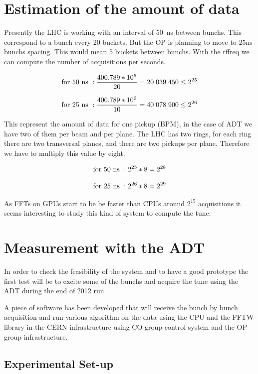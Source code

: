 %

\appendix

\chapter{Estimation of the amount of data}

Presently the \gls{LHC} is working with an interval of 50~ns between \glspl{bunch}. This correspond to a bunch every 20 \glspl{bucket}. But the \gls{OP} is planning to move to 25ns \glspl{bunch} spacing. This would mean 5 \glspl{bucket} between \glspl{bunch}. With the \gls{rffreq} we can compute the number of acquisitions per seconds.

$${\rm for~}50{\rm ~ns}~: \frac{400.789*10^{6}}{20} = 20\;039\;450 \leq 2^{25}$$

$${\rm for~}25{\rm ~ns}~: \frac{400.789*10^{6}}{10} = 40\;078\;900 \leq 2^{26}$$ 

This represent the amount of data for one pickup (\gls{BPM}), in the case of \gls{ADT} we have two of them per beam and per plane. The \gls{LHC} has two rings, for each ring there are two transversal planes, and there are two pickups per plane. Therefore we have to multiply this value by eight.

$${\rm for~}50{\rm ~ns}~: 2^{25} * 8 = 2^{28}$$

$${\rm for~}25{\rm ~ns}~: 2^{26} * 8 = 2^{29}$$

As \glspl{FFT} on \glspl{GPU} start to be be faster than \glspl{CPU} around $2^{15}$ acquisitions it seems interesting to study this kind of system to compute the \gls{tune}.

\chapter{Measurement with the ADT}

In order to check the feasibility of the system and to have a good prototype the first test will be to excite some of the \glspl{bunch} and acquire the \gls{tune} using the \gls{ADT} during the end of 2012 run\cite{Valuch12}.

A piece of software has been developed that will receive the bunch by bunch acquisition and run various algorithm on the data using the \gls{CPU} and the \gls{FFTW} library in the \gls{CERN} infrastructure using \gls{CO} group control system and the \gls{OP} group infrastructure.

\section{Experimental Set-up}

